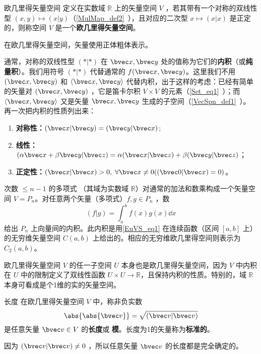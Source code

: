 

\begin{definition}{欧几里得矢量空间}\label{EuVS_def1}
定义在实数域 $\mathbb R$ 上的矢量空间 $V$ ，若其带有一个对称的双线性型 $( x, y)\mapsto( x| y)$（\autoref{MulMap_def2}~），且对应的二次型 $ x\mapsto( x| x)$ 是正定的，则称空间 $V$ 是一个\textbf{欧几里得矢量空间}。
\end{definition}

在欧几里得矢量空间，矢量使用正体粗体表示。

通常，对称的双线性型 $(*|*)$ 在 $\bvec x,\bvec y$ 处的值称为它们的\textbf{内积}（或\textbf{纯量积}）。我们用符号 $(*|*)$ 代替通常的 $f(\bvec x,\bvec y)$。这里我们不用 $(\bvec x,\bvec y)$ 和 $\langle\bvec x,\bvec y\rangle$ 代替内积，出于这样的考虑：已经有简单的矢量对 $(\bvec x,\bvec y)$ ，它是笛卡尔积 $V\times V$ 的元素（\autoref{Set_eq1}~）；而 $\langle \bvec x,\bvec y\rangle $ 又是矢量 $\bvec x,\bvec y$ 生成的子空间（\autoref{VecSpn_def1}~）。
再一次把内积的性质列出来：
\begin{enumerate}
\item \textbf{对称性：}$(\bvec x|\bvec y)=(\bvec y|\bvec x)$;
\item \textbf{线性：}$(\alpha\bvec x+\beta\bvec y|\bvec z)=\alpha(\bvec x|\bvec z)+\beta(\bvec y|\bvec z)$；
\item \textbf{正定性：}$(\bvec x|\bvec x)>0,\;\forall\bvec x\neq0((\bvec 0|\bvec x)=0)$。
\end{enumerate}
\begin{example}{}\label{EuVS_ex1}
次数 $\leq n-1$ 的多项式 （其域为实数域 $\mathbb R$）对通常的加法和数乘构成一个矢量空间 $V=P_n$。对任意两个矢量（多项式）$f,g\in P_n$ ，数 
\begin{equation}\label{EuVS_eq1}
(f|g)=\int_a^b f(x)g(x)\dd x
\end{equation}
给出 $P_n$ 上向量间的内积。此内积是用\autoref{EuVS_eq1} 在连续函数（区间 $[a,b]$ 上）的无穷维矢量空间 $C(a,b)$ 上给出的。相应的无穷维欧几里得空间则表示为 $C_2(a,b)$。
\end{example}
\begin{example}{}
欧几里得矢量空间 $V$ 的任一子空间 $U$ 本身也是欧几里得矢量空间，因为 $V$ 中内积在 $U$ 中的限制定义了双线性函数 $U\times U\rightarrow\mathbb R$，且保持内积的性质。特别的，域 $\mathbb R$ 本身可看成是个1维的实的矢量空间。
\end{example}
\begin{definition}{长度}\label{EuVS_def2}
在欧几里得矢量空间 $V$ 中，称非负实数
\begin{equation}
\abs{\abs{\bvec v}}=\sqrt{(\bvec v|\bvec v)}
\end{equation}
是任意矢量 $\bvec v\in V$ 的\textbf{长度}或 \textbf{模}。长度为1的矢量称为\textbf{标准的}。
\end{definition}
因为 $(\bvec v|\bvec v)\neq0$ ，所以任意矢量 $\bvec v$ 的长度都是完全确定的。

